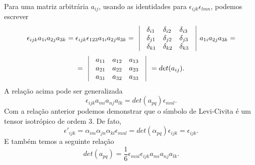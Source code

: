 Para uma matriz arbitr\'aria $a_{ij}$, usando as identidades  para
$\epsilon_{ijk}\epsilon_{lmn}$, podemos escrever
\[\epsilon_{ijk}a_{1i}a_{2j}a_{3k}=\epsilon_{ijk}\epsilon_{123}a_{1i}a_{2j}a_{3k}=
\begin{array}{lllll}
                \vline&\delta_{i1} & \delta_{i2} & \delta_{i3}&\vline \\
                \vline&\delta_{j1} & \delta_{j2} & \delta_{j3}&\vline \\
                \vline&\delta_{k1} & \delta_{k2} & \delta_{k3}& \vline\\
\end{array}a_{1i}a_{2j}a_{3k}=\] \[ =\begin{array}{lllll}
                \vline&a_{11} & a_{12} & a_{13}& \vline\\
                \vline&a_{21} & a_{22} & a_{23}&\vline \\
                \vline&a_{31} & a_{32} & a_{33}&\vline \\
\end{array}=det(a_{ij}).\]
A rela\c{c}\~ao acima pode ser generalizada
\[\epsilon_{ijk}a_{mi}a_{nj}a_{lk}=det(a_{pq})\epsilon_{mnl}.\]
Com a rela\c{c}\~ao anterior podemos demonstrar que  o s\'\i mbolo
de Levi-Civita \'e um tensor isotr\'opico de ordem $3$. De fato,
\[\epsilon'_{ijk}=\alpha_{im}\alpha_{jn}\alpha_{kl}\epsilon_{mnl}=det(\alpha_{pq})\epsilon_{ijk}=\epsilon_{ijk}.\]
E tamb\'em temos a seguinte rela\c{c}\~ao
\[det(a_{pq})=\frac{1}{6}\epsilon_{mnl}\epsilon_{ijk}a_{mi}a_{nj}a_{lk}.\]




